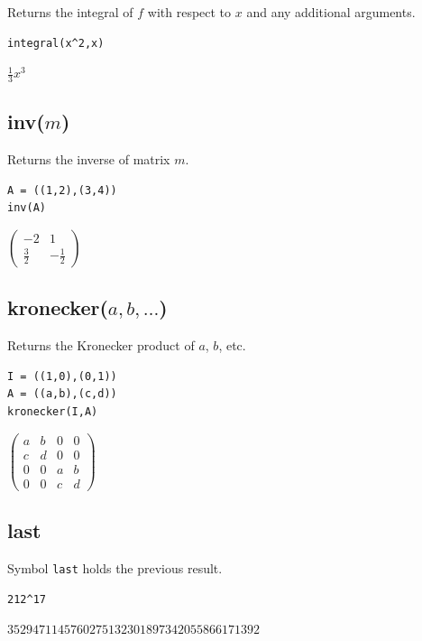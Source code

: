 Returns the integral of $f$ with respect to $x$ and any additional arguments.

{\color{blue}
\begin{verbatim}
integral(x^2,x)
\end{verbatim}
}

$\displaystyle \tfrac{1}{3}x^3$

\subsection*{inv($m$)}

Returns the inverse of matrix $m$.

{\color{blue}
\begin{verbatim}
A = ((1,2),(3,4))
inv(A)
\end{verbatim}
}

$\displaystyle
\begin{pmatrix}
-2 & 1
\\[1ex]
\tfrac{3}{2} & -\tfrac{1}{2}
\end{pmatrix}
$

\subsection*{kronecker($a,b,\ldots$)}

Returns the Kronecker product of $a$, $b$, etc.

{\color{blue}
\begin{verbatim}
I = ((1,0),(0,1))
A = ((a,b),(c,d))
kronecker(I,A)
\end{verbatim}
}

$\displaystyle
\begin{pmatrix}
a & b & 0 & 0
\\[1ex]
c & d & 0 & 0
\\[1ex]
0 & 0 & a & b
\\[1ex]
0 & 0 & c & d
\end{pmatrix}
$

\subsection*{last}

Symbol {\tt last} holds the previous result.

{\color{blue}
\begin{verbatim}
212^17
\end{verbatim}
}

$3529471145760275132301897342055866171392$


